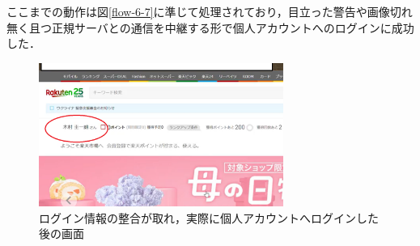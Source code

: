 \documentclass[dvipdfmx,twocolumn]{jsarticle}
\begin{document}
                ここまでの動作は図\ref{flow-6-7}に準じて処理されており，目立った警告や画像切れ無く且つ正規サーバとの通信を中継する形で個人アカウントへのログインに成功した．\
                \begin{figure}[h]
                    \centering
                    \includegraphics[width=8cm]{img/rakuten/rakuten-05.png}
                    \caption{ログイン情報の整合が取れ，実際に個人アカウントへログインした後の画面}
                    \label{rakuten-05}
                \end{figure}
\end{document}
